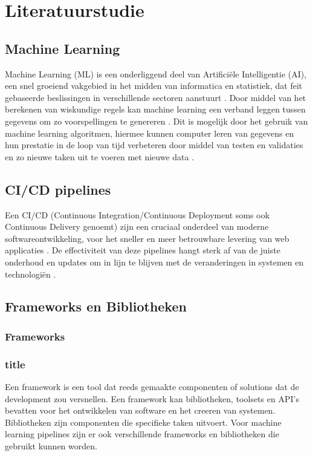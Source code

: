 
\section{Literatuurstudie}%
\label{sec:state-of-the-art}

\subsection{Machine Learning}
Machine Learning (ML) is een onderliggend deel van Artificiële Intelligentie (AI), een snel groeiend vakgebied in het midden van informatica en statistiek, dat feit gebaseerde beslissingen in verschillende sectoren aanstuurt \autocite{Jordan2015}.
Door middel van het berekenen van wiskundige regels kan machine learning een verband leggen tussen gegevens om zo voorspellingen te genereren \autocite{Cybenko2001}.
Dit is mogelijk door het gebruik van machine learning algoritmen, hiermee kunnen computer leren van gegevens en hun prestatie in de loop van tijd verbeteren door middel van testen en validaties en zo nieuwe taken uit te voeren met nieuwe data \autocite{Shaveta2023}.
\subsection{CI/CD pipelines}
Een CI/CD (Continuous Integration/Continuous Deployment soms ook Continuous Delivery genoemt) zijn een cruciaal onderdeel van moderne softwareontwikkeling, voor het sneller en meer betrouwbare levering van web applicaties \autocite{Singh2023}.
De effectiviteit van deze pipelines hangt sterk af van de juiste onderhoud en updates om in lijn te blijven met de veranderingen in systemen en technologiën \autocite{Zampetti2021}.
\subsection{Frameworks en Bibliotheken}
\subsubsection{Frameworks}
\subsubsection{title}
Een framework is een tool dat reeds gemaakte componenten of solutions dat de development zou versnellen. Een framework kan bibliotheken, toolsets en API's bevatten voor het ontwikkelen van software en het creeren van systemen.
Bibliotheken zijn componenten die specifieke taken uitvoert. 
Voor machine learning pipelines zijn er ook verschillende frameworks en bibliotheken die gebruikt kunnen worden.

